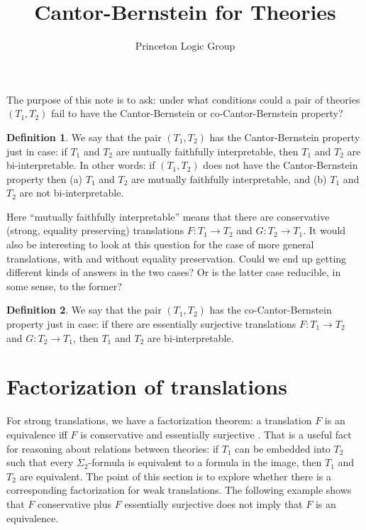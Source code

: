 \documentclass[12pt]{article}
\title{Cantor-Bernstein for Theories}
\author{Princeton Logic Group}
\theoremstyle{definition}
\newtheorem*{defn}{Definition}
\theoremstyle{remark}
\newcommand{\3}{\mathcal}
\begin{document}


\maketitle

The purpose of this note is to ask: under what conditions could a pair
of theories $(T_1,T_2)$ fail to have the Cantor-Bernstein or
co-Cantor-Bernstein property?

\begin{defn} We say that the pair $(T_1,T_2)$ has the Cantor-Bernstein
  property just in case: if $T_1$ and $T_2$ are mutually faithfully
  interpretable, then $T_1$ and $T_2$ are bi-interpretable. In other
  words: if $(T_1,T_2)$ does not have the Cantor-Bernstein property
  then (a) $T_1$ and $T_2$ are mutually faithfully interpretable, and
  (b) $T_1$ and $T_2$ are not bi-interpretable. \end{defn}

Here ``mutually faithfully interpretable'' means that there are
conservative (strong, equality preserving) translations $F:T_1\to T_2$
and $G:T_2\to T_1$. It would also be interesting to look at this
question for the case of more general translations, with and without
equality preservation. Could we end up getting different kinds of
answers in the two cases? Or is the latter case reducible, in some
sense, to the former?

\begin{defn} We say that the pair $(T_1,T_2)$ has the
  co-Cantor-Bernstein property just in case: if there are essentially
  surjective translations $F:T_1\to T_2$ and $G:T_2\to T_1$, then
  $T_1$ and $T_2$ are bi-interpretable. \end{defn}

\newcommand{\2}{\mathsf}

\section{Factorization of translations}

For strong translations, we have a factorization theorem: a
translation $F$ is an equivalence iff $F$ is conservative and
essentially surjective \citep[Props.\ 4.5.26, 4.5.27]{tlps}. That is a
useful fact for reasoning about relations between theories: if $T_1$
can be embedded into $T_2$ such that every $\Sigma _2$-formula is
equivalent to a formula in the image, then $T_1$ and $T_2$ are
equivalent. The point of this section is to explore whether there is a
corresponding factorization for weak translations. The following
example shows that $F$ conservative plus $F$ essentially surjective
does not imply that $F$ is an equivalence.
\end{document}
